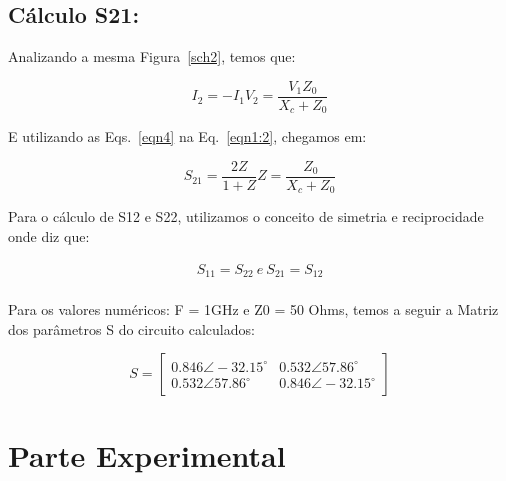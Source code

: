 \documentclass[a4paper,12pt]{proc}
\begin{document}
\subsection{Cálculo S21:}

Analizando a mesma Figura~\ref{sch2}, temos que:

\begin{subequations}
    \label{eqn4}
    \begin{equation}
        \label{eqn4:1}
        I_{2} = - I_{1}
    \end{equation}

    \begin{equation}
        \label{eqn4:2}
        V_{2} = \frac{V_{1}Z_{0}}{X_{c}+Z_{0}}
    \end{equation}
\end{subequations}

E utilizando as Eqs.~\ref{eqn4} na Eq.~\ref{eqn1:2}, chegamos em:

\begin{subequations}
    \label{eqn5}
    \begin{equation}
        \label{eqn5:1}
        S_{21} = \frac{2Z}{1+Z}
    \end{equation}

    \begin{equation}
        \label{eqn5:2}
        Z = \frac{Z_{0}}{X_{c}+Z_{0}}
    \end{equation}
\end{subequations}

Para o cálculo de S12 e S22, utilizamos o conceito de simetria e reciprocidade onde diz que:

\begin{align*}
    S_{11} = S_{22} ~e~  S_{21} = S_{12}\\
\end{align*}

Para os valores numéricos: F = 1GHz e Z0 = 50 Ohms, temos a seguir a Matriz dos parâmetros S do circuito calculados:

\[S = \begin{bmatrix} 0.846\angle -32.15^{\circ} & 0.532\angle 57.86^{\circ} \\ 0.532\angle 57.86^{\circ} & 0.846\angle -32.15^{\circ} \end{bmatrix}\]



\section{Parte Experimental}
\end{document}
